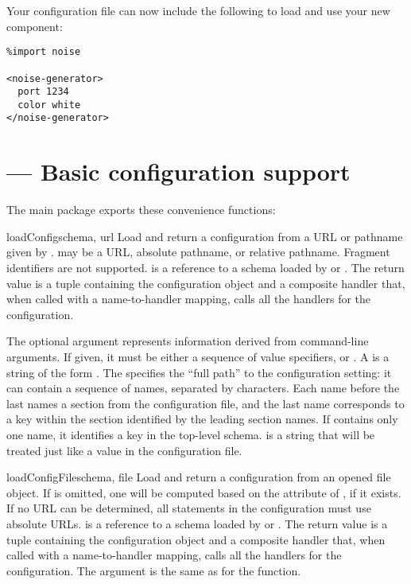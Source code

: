 \documentclass{howto}
\begin{document}
Your configuration file can now include the following to load and use
your new component:

\begin{verbatim}
%import noise

<noise-generator>
  port 1234
  color white
</noise-generator>
\end{verbatim}


\section{ --- Basic configuration support}


The main  package exports these convenience functions:

\begin{funcdesc}{loadConfig}{schema, url}
  Load and return a configuration from a URL or pathname given by
  .   may be a URL, absolute pathname, or relative
  pathname.  Fragment identifiers are not supported.   is
  a reference to a schema loaded by  or
  .
  The return value is a tuple containing the configuration object and
  a composite handler that, when called with a name-to-handler
  mapping, calls all the handlers for the configuration.

  The optional  argument represents information derived
  from command-line arguments.  If given, it must be either a sequence
  of value specifiers, or .  A  is a
  string of the form .  The
   specifies the ``full path'' to the configuration
  setting: it can contain a sequence of names, separated by
  \character{/} characters. Each name before the last names a section
  from the configuration file, and the last name corresponds to a key
  within the section identified by the leading section names.  If
   contains only one name, it identifies a key in the
  top-level schema.   is a string that will be treated
  just like a value in the configuration file.
\end{funcdesc}

\begin{funcdesc}{loadConfigFile}{schema, file}
  Load and return a configuration from an opened file object.  If
   is omitted, one will be computed based on the
   attribute of , if it exists.  If no URL can
  be determined, all  statements in the
  configuration must use absolute URLs.   is a reference
  to a schema loaded by  or
  .
  The return value is a tuple containing the configuration object and
  a composite handler that, when called with a name-to-handler
  mapping, calls all the handlers for the configuration.
  The  argument is the same as for the
   function.
\end{funcdesc}
\end{document}

